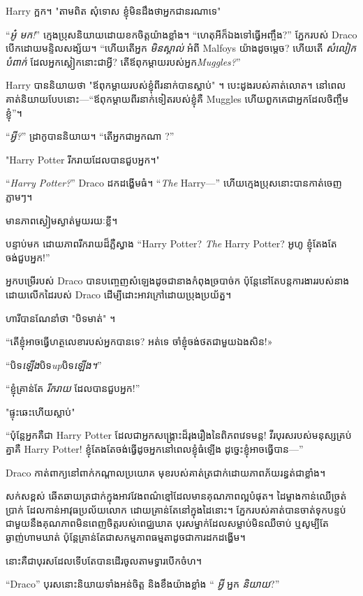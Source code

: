 Harry ក្អក។ "តាមពិត សុំទោស ខ្ញុំមិនដឹងថាអ្នកជានរណាទេ"

“\emph{អូ៎ មក!}” ក្មេងប្រុសនិយាយដោយខកចិត្តយ៉ាងខ្លាំង។ “ហេតុអីក៏ឯងទៅធ្វើអញ្ចឹង?” ភ្នែករបស់ Draco បើកដោយមន្ទិលសង្ស័យ។ “ហើយតើអ្នក \emph{មិនស្គាល់} អំពី Malfoys យ៉ាងដូចម្តេច? ហើយតើ \emph{សំលៀកបំពាក់} ដែលអ្នកស្លៀកនោះជាអ្វី? តើឪពុកម្តាយរបស់អ្នក\emph{Muggles?}”

Harry បាននិយាយថា "ឪពុកម្តាយរបស់ខ្ញុំពីរនាក់បានស្លាប់" ។ បេះដូងរបស់គាត់លោត។ នៅពេលគាត់និយាយបែបនោះ—“ឪពុកម្តាយពីរនាក់ទៀតរបស់ខ្ញុំគឺ Muggles ហើយពួកគេជាអ្នកដែលចិញ្ចឹមខ្ញុំ”។

“\emph{អ្វី?}” ដ្រាកូបាននិយាយ។ “តើអ្នកជាអ្នកណា \emph{}?”

"Harry Potter រីករាយដែលបានជួបអ្នក។"

“\emph{Harry Potter?}” Draco ដកដង្ហើមធំ។ “\emph{The} Harry—” ហើយក្មេងប្រុសនោះបានកាត់ចេញភ្លាមៗ។

មាន​ភាព​ស្ងៀមស្ងាត់​មួយ​រយៈ​ខ្លី។

បន្ទាប់មក ដោយភាពរីករាយដ៏ភ្លឺស្វាង “Harry Potter? \emph{The} Harry Potter? អូហូ ខ្ញុំតែងតែចង់ជួបអ្នក!”

អ្នកបម្រើរបស់ Draco បានបញ្ចេញសំឡេងដូចជានាងកំពុងច្របាច់ក ប៉ុន្តែនៅតែបន្តការងាររបស់នាង ដោយលើកដៃរបស់ Draco ដើម្បីដោះអាវក្រៅដោយប្រុងប្រយ័ត្ន។

ហារីបានណែនាំថា "បិទមាត់" ។

“តើខ្ញុំអាចធ្វើហត្ថលេខារបស់អ្នកបានទេ? អត់​ទេ ចាំ​ខ្ញុំ​ចង់​ថត​ជាមួយ​ឯង​សិន!»

“បិទ\emph{ឡើង}បិទ\emph{up}បិទ\emph{ឡើង។}”

“ខ្ញុំគ្រាន់តែ \emph{រីករាយ} ដែលបានជួបអ្នក!”

"ផ្ទុះឆេះហើយស្លាប់"

“ប៉ុន្តែអ្នកគឺជា Harry Potter ដែលជាអ្នកសង្គ្រោះដ៏រុងរឿងនៃពិភពវេទមន្ត! វីរបុរសរបស់មនុស្សគ្រប់គ្នាគឺ Harry Potter! ខ្ញុំតែងតែចង់ធ្វើដូចអ្នកនៅពេលខ្ញុំធំឡើង ដូច្នេះខ្ញុំអាចធ្វើបាន—”

Draco កាត់ពាក្យនៅពាក់កណ្តាលប្រយោគ មុខរបស់គាត់ត្រជាក់ដោយភាពភ័យរន្ធត់ជាខ្លាំង។

សក់​ស​ខ្ពស់ ឆើតឆាយ​ត្រជាក់​ក្នុង​អាវ​វែង​ពណ៌​ខ្មៅ​ដែល​មាន​គុណភាព​ល្អ​បំផុត។ ដៃម្ខាងកាន់ឈើច្រត់ប្រាក់ ដែលកាន់អាវុធប្រល័យលោក ដោយគ្រាន់តែនៅក្នុងដៃនោះ។ ភ្នែករបស់គាត់បានចាត់ទុកបន្ទប់ជាមួយនឹងគុណភាពមិនពេញចិត្តរបស់ពេជ្ឈឃាត បុរសម្នាក់ដែលសម្លាប់មិនឈឺចាប់ ឬសូម្បីតែឆ្ងាញ់ហាមឃាត់ ប៉ុន្តែគ្រាន់តែជាសកម្មភាពធម្មតាដូចជាការដកដង្ហើម។

នោះគឺជាបុរសដែលទើបតែបានដើរចូលតាមទ្វារបើកចំហ។

“Draco” បុរសនោះនិយាយទាំងអន់ចិត្ត និងខឹងយ៉ាងខ្លាំង “\emph{ អ្វី} អ្នក \emph{និយាយ}?”

